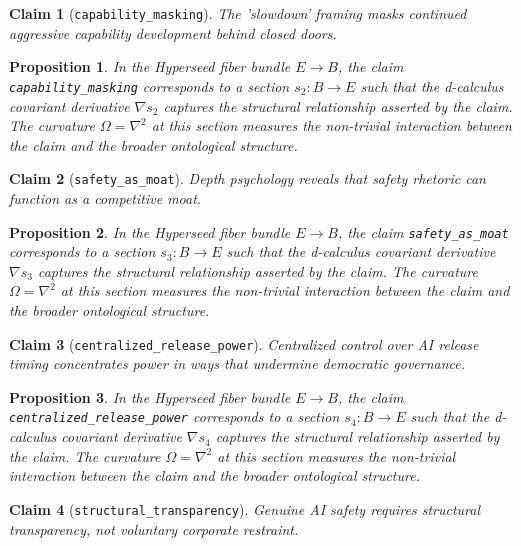 \documentclass{article}
\newtheorem{claim}{Claim}
\newtheorem{proposition}{Proposition}
\begin{document}
\begin{claim}[\texttt{capability_masking}]
The 'slowdown' framing masks continued aggressive capability development behind closed doors.
\end{claim}

\begin{proposition}
In the Hyperseed fiber bundle $E \to B$, the claim \texttt{capability_masking} corresponds to a section $s_2: B \to E$ such that the d-calculus covariant derivative $\nabla s_2$ captures the structural relationship asserted by the claim. The curvature $\Omega = \nabla^2$ at this section measures the non-trivial interaction between the claim and the broader ontological structure.
\end{proposition}

\begin{claim}[\texttt{safety_as_moat}]
Depth psychology reveals that safety rhetoric can function as a competitive moat.
\end{claim}

\begin{proposition}
In the Hyperseed fiber bundle $E \to B$, the claim \texttt{safety_as_moat} corresponds to a section $s_3: B \to E$ such that the d-calculus covariant derivative $\nabla s_3$ captures the structural relationship asserted by the claim. The curvature $\Omega = \nabla^2$ at this section measures the non-trivial interaction between the claim and the broader ontological structure.
\end{proposition}

\begin{claim}[\texttt{centralized_release_power}]
Centralized control over AI release timing concentrates power in ways that undermine democratic governance.
\end{claim}

\begin{proposition}
In the Hyperseed fiber bundle $E \to B$, the claim \texttt{centralized_release_power} corresponds to a section $s_4: B \to E$ such that the d-calculus covariant derivative $\nabla s_4$ captures the structural relationship asserted by the claim. The curvature $\Omega = \nabla^2$ at this section measures the non-trivial interaction between the claim and the broader ontological structure.
\end{proposition}

\begin{claim}[\texttt{structural_transparency}]
Genuine AI safety requires structural transparency, not voluntary corporate restraint.
\end{claim}
\end{document}
